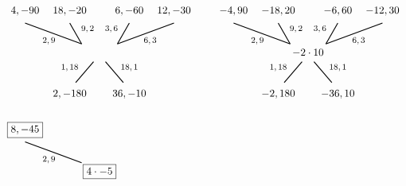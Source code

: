 \documentclass[11pt,letterpaper]{article}
\begin{document}
\[\begin{tikzpicture}
	\node at (-1.7,0.4) {\footnotesize$2, 9$};
	\draw[line width=0.03cm,label={1}] (-0.6,0.3) -- (-2.5,1);
	\node at (-2.5,1.4) {$4, -90$};
	
	\node at (-0.4,0.8) {\footnotesize$9, 2$};
	\draw[line width=0.03cm,label={1}] (-0.6,0.3) -- (-1,1);
	\node at (-1,1.4) {$18, -20$};

	\node at (0.4,0.8) {\footnotesize$3, 6$};
	\draw[line width=0.03cm,label={1}] (0.6,0.3) -- (1,1);
	\node at (1,1.4) {$6, -60$};
	
	\node at (1.7,0.4) {\footnotesize$6, 3$};
	\draw[line width=0.03cm,label={1}] (0.6,0.3) -- (2.5,1);
	\node at (2.5,1.4) {$12, -30$};
	
	\node at (-1,-0.5) {\footnotesize$1, 18$};
	\draw[line width=0.03cm,label={1}] (-0.2,-0.3) -- (-0.8,-1);
	\node at (-1,-1.4) {$2, -180$};

	\node at (1,-0.5) {\footnotesize$18, 1$};
	\draw[line width=0.03cm,label={1}] (0.2,-0.3) -- (0.8,-1);
	\node at (1,-1.4) {$36, -10$};

	\tikzset{shift={(7,0)}}
	
	\node at (0,0) {$-2 \cdot 10$};
	
	\node at (-1.7,0.4) {\footnotesize$2, 9$};
	\draw[line width=0.03cm,label={1}] (-0.6,0.3) -- (-2.5,1);
	\node at (-2.5,1.4) {$-4, 90$};
	
	\node at (-0.4,0.8) {\footnotesize$9, 2$};
	\draw[line width=0.03cm,label={1}] (-0.6,0.3) -- (-1,1);
	\node at (-1,1.4) {$-18, 20$};

	\node at (0.4,0.8) {\footnotesize$3, 6$};
	\draw[line width=0.03cm,label={1}] (0.6,0.3) -- (1,1);
	\node at (1,1.4) {$-6, 60$};
	
	\node at (1.7,0.4) {\footnotesize$6, 3$};
	\draw[line width=0.03cm,label={1}] (0.6,0.3) -- (2.5,1);
	\node at (2.5,1.4) {$-12, 30$};
	
	\node at (-1,-0.5) {\footnotesize$1, 18$};
	\draw[line width=0.03cm,label={1}] (-0.2,-0.3) -- (-0.8,-1);
	\node at (-1,-1.4) {$-2, 180$};

	\node at (1,-0.5) {\footnotesize$18, 1$};
	\draw[line width=0.03cm,label={1}] (0.2,-0.3) -- (0.8,-1);
	\node at (1,-1.4) {$-36, 10$};
	
	\tikzset{shift={(-7,-4)}}
	
	\node at (0,0) {\framebox{$4 \cdot -5$}};
	
	\node at (-1.7,0.4) {\footnotesize$2, 9$};
	\draw[line width=0.03cm,label={1}] (-0.6,0.3) -- (-2.5,1);
	\node at (-2.5,1.4) {\framebox{$8, -45$}};
	

\end{tikzpicture}\]
\end{document}
